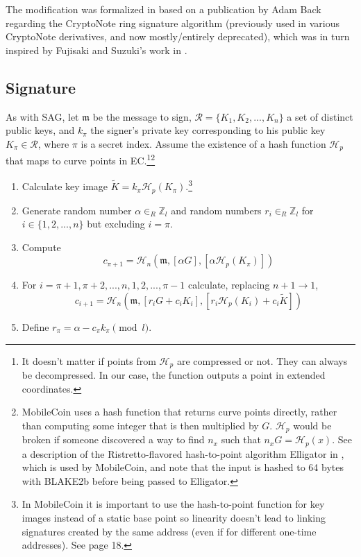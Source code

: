 The modification was formalized in \cite{MRL-0005-ringct} based on a publication by Adam Back \cite{AdamBack-ring-efficiency} regarding the CryptoNote \cite{cryptoNoteWhitePaper} ring signature algorithm (previously used in various CryptoNote derivatives, and now mostly/entirely deprecated), which was in turn inspired by Fujisaki and Suzuki's work in \cite{Fujisaki2007}.


\subsection*{Signature}

As with SAG, let \(\mathfrak{m}\) be the message to sign, \(\mathcal{R} = \{K_1, K_2, ..., K_n\}\) a set of distinct public keys, and \(k_\pi\) the signer's private key corresponding to his public key \(K_\pi \in \mathcal{R}\), where $\pi$ is a secret index. Assume the existence of a hash function \(\mathcal{H}_p\) that maps to curve points in EC.\footnote{It doesn’t matter if points from $\mathcal{H}_p$ are compressed or not. They can always be decompressed. In our case, the function outputs a point in extended coordinates.}\footnote{MobileCoin uses a hash function that returns curve points directly, rather than computing some integer that is then multiplied by $G$. $\mathcal{H}_p$ would be broken if someone discovered a way to find $n_x$ such that $n_x G = \mathcal{H}_p(x)$. See a description of the Ristretto-flavored hash-to-point algorithm Elligator in \cite{ristretto-elligator}, which is used by MobileCoin, and note that the input is hashed to 64 bytes with BLAKE2b before being passed to Elligator.}

\begin{enumerate}
	\item Calculate key image \(\tilde{K} = k_\pi \mathcal{H}_p(K_\pi)\).\footnote{In MobileCoin it is important to use the hash-to-point function for key images instead of a static base point so linearity doesn't lead to linking signatures created by the same address (even if for different one-time addresses). See \cite{cryptoNoteWhitePaper} page 18.}

	\item Generate random number \(\alpha \in_R \mathbb{Z}_l\) and random numbers \(r_i \in_R \mathbb{Z}_l\) for \(i \in \{1, 2, ..., n\}\) but excluding \(i = \pi\).

	\item Compute
	\[c_{\pi+1} = \mathcal{H}_n(\mathfrak{m}, [\alpha G], [\alpha \mathcal{H}_p(K_\pi)])\]

	\item For \(i = \pi+1, \pi+2, ..., n, 1, 2, ..., \pi-1\) calculate, replacing \(n + 1 \rightarrow 1\),\vspace{.175cm}
	\[c_{i+1} = \mathcal{H}_n(\mathfrak{m}, [r_i G + c_i K_i], [r_i \mathcal{H}_p(K_i) + c_i \tilde{K}])\]

	\item Define \(r_\pi = \alpha - c_\pi k_\pi \pmod l\).
\end{enumerate}

